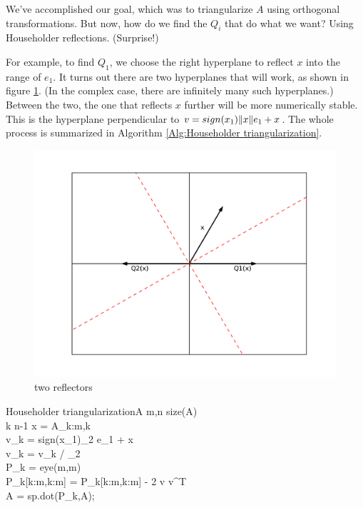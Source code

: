 We've accomplished our goal, which was to triangularize $A$ using orthogonal transformations. But now, how do we find the $Q_i$ that do what we want? Using Householder reflections. (Surprise!)

For example, to find $Q_1$, we choose the right hyperplane to reflect $x$ into the range of $e_1$. It turns out there are two hyperplanes that will work, as shown in figure \ref{fig:two reflectors}. (In the complex case, there are infinitely many such hyperplanes.) Between the two, the one that reflects $x$ further will be more numerically stable. This is the hyperplane perpendicular to \textbf{$v = sign(x_1)\lVert x\rVert e_1 + x$}. The whole process is summarized in Algorithm \ref{Alg:Householder triangularization}.

\begin{figure}
	\centering
	\includegraphics[width= \textwidth]{fig2}
	\caption{two reflectors}
	\label{fig:two reflectors}
\end{figure}

\begin{pseudo}{Householder triangularization}{A}
\label{Alg:Householder triangularization}
m,n \GETS size(A)\\
\FOR k  \TO n-1 \DO
\BEGIN
   x = A_{k:m,k}\\
   v_k = sign(x_1)_2 e_1 + x\\
   v_k = v_k / _2\\
   P_k = eye(m,m)\\
   P_k[k:m,k:m] = P_k[k:m,k:m] - 2 v v^T\\
   A = sp.dot(P_k,A);
\END
\end{pseudo}

